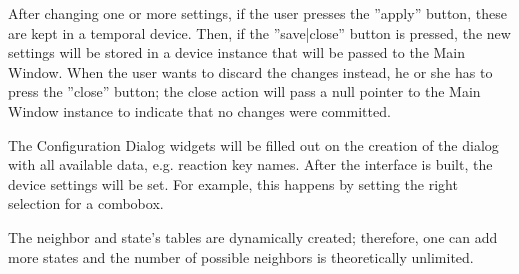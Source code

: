 After changing one or more settings, if the user presses the ''apply'' button, these are kept in a temporal device. Then, if the ''save|close'' button is pressed, the new settings will be stored in a device instance that will be passed to the Main Window. When the user wants to discard the changes instead, he or she has to press the ''close'' button; the close action will pass a null pointer to the Main Window instance to indicate that no changes were committed. 


The Configuration Dialog widgets will be filled out on the creation of the dialog with all available data, e.g. reaction key names. After the interface is built, the device settings will be set. For example, this happens by setting the right selection for a combobox.

The neighbor and state's tables are dynamically created; therefore, one can add more states and the number of possible neighbors is theoretically unlimited.


